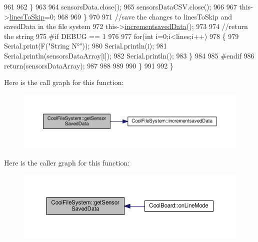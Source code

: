 \begin{DoxyCode}
961 
962             \}
963 
964             sensorsData.close();
965             sensorsDataCSV.close();
966             
967             this->\hyperlink{class_cool_file_system_a84fdb6057e534b395512463daa28ea3c}{linesToSkip}=0;
968         
969         \}
970 
971         \textcolor{comment}{//save the changes to linesToSkip and savedData in the file system}
972         this->\hyperlink{class_cool_file_system_aae045125288f255f3e258073dcada2a6}{incrementsavedData}();
973 
974         \textcolor{comment}{//return the string}
975 \textcolor{preprocessor}{        #if DEBUG == 1}
976         
977             \textcolor{keywordflow}{for}(\textcolor{keywordtype}{int} i=0;i<lines;i++)
978             \{
979                 Serial.print(F(\textcolor{stringliteral}{"String N°"}));
980                 Serial.println(i);
981                 Serial.println(sensorsDataArray[i]);
982                 Serial.println();           
983             \}
984     
985 \textcolor{preprocessor}{        #endif}
986         \textcolor{keywordflow}{return}(sensorsDataArray);
987         
988         
989         
990     \}
991 
992 \}
\end{DoxyCode}
Here is the call graph for this function\+:\nopagebreak
\begin{figure}[H]
\begin{center}
\leavevmode
\includegraphics[width=350pt]{db/d0c/class_cool_file_system_a3223ffff4266a6300988fab956d6b4b2_cgraph}
\end{center}
\end{figure}
Here is the caller graph for this function\+:\nopagebreak
\begin{figure}[H]
\begin{center}
\leavevmode
\includegraphics[width=350pt]{db/d0c/class_cool_file_system_a3223ffff4266a6300988fab956d6b4b2_icgraph}
\end{center}
\end{figure}
\mbox{\label{class_cool_file_system_aae045125288f255f3e258073dcada2a6}} 
